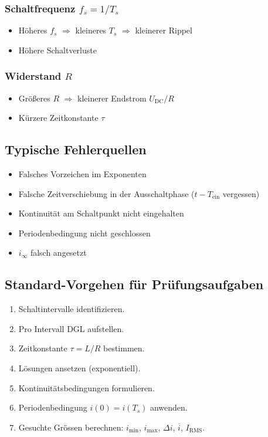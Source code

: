 \subsubsection{Schaltfrequenz $f_s = 1/T_s$}
\begin{itemize}
    \item Höheres $f_s$ $\Rightarrow$ kleineres $T_s$ $\Rightarrow$ kleinerer Rippel
    \item Höhere Schaltverluste
\end{itemize}

\subsubsection{Widerstand $R$}
\begin{itemize}
    \item Größeres $R$ $\Rightarrow$ kleinerer Endstrom $U_{\mathrm{DC}}/R$
    \item Kürzere Zeitkonstante $\tau$
\end{itemize}

\subsection{Typische Fehlerquellen}



\begin{itemize}
    \item Falsches Vorzeichen im Exponenten
    \item Falsche Zeitverschiebung in der Ausschaltphase ($t-T_{\mathrm{ein}}$ vergessen)
    \item Kontinuität am Schaltpunkt nicht eingehalten
    \item Periodenbedingung nicht geschlossen
    \item $i_\infty$ falsch angesetzt
\end{itemize}

\subsection{Standard-Vorgehen für Prüfungsaufgaben}

\begin{enumerate}
    \item Schaltintervalle identifizieren.
    \item Pro Intervall DGL aufstellen.
    \item Zeitkonstante $\tau=L/R$ bestimmen.
    \item Lösungen ansetzen (exponentiell).
    \item Kontinuitätsbedingungen formulieren.
    \item Periodenbedingung $i(0)=i(T_s)$ anwenden.
    \item Gesuchte Grössen berechnen: $i_{\min}$, $i_{\max}$, $\Delta i$, $\overline{i}$, $I_{\mathrm{RMS}}$.
\end{enumerate}
